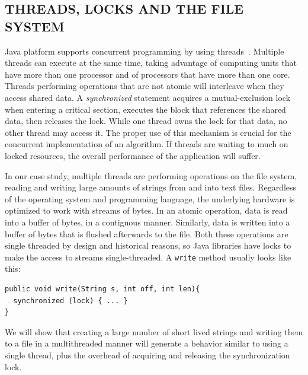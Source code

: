 \documentclass[a4paper,twoside]{article}
\begin{document}
\subsection{\uppercase{Threads, Locks and the File System}}\label{subsec:uppercase13}

Java platform supports concurrent programming by using threads~\cite{gosling:2014}.
Multiple threads can execute at the same time, taking advantage of computing units that have more than one processor and of processors that have more than one core.
Threads performing operations that are not atomic will interleave when they access shared data.
A {\textit{synchronized} } statement acquires a mutual-exclusion lock when entering a critical section, executes the block that references the shared data, then releases the lock.
While one thread owns the lock for that data, no other thread may access it. 
The proper use of this mechanism is crucial for the concurrent implementation of an algorithm.
If threads are waiting to much on locked resources, the overall performance of the application will suffer.

In our case study, multiple threads are performing operations on the file system, reading and writing large amounts of strings from and into text files.
Regardless of the operating system and programming language, the underlying hardware is optimized to work with streams of bytes.
In an atomic operation, data is read into a buffer of bytes, in a contiguous manner.
Similarly, data is written into a buffer of bytes that is flushed afterwards to the file.
Both these operations are single threaded by design and historical reasons, so Java libraries have locks to make the access to streams single-threaded.
A \texttt{write} method usually looks like this:
\begin{small}
\begin{verbatim}
public void write(String s, int off, int len){
  synchronized (lock) { ... }
}
\end{verbatim}
\end{small}

%

We will show that creating a large number of short lived strings and writing them to a file in a multithreaded manner will generate a behavior similar to using a single thread, plus the overhead of acquiring and releasing the synchronization lock.
\end{document}
